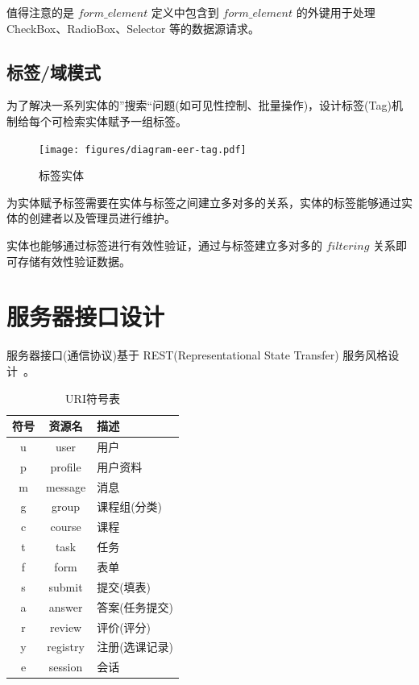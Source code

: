 值得注意的是 $form\_element$ 定义中包含到 $form\_element$ 的外键用于处理 CheckBox、RadioBox、Selector 等的数据源请求。

\subsection{标签/域模式}

为了解决一系列实体的”搜索“问题(如可见性控制、批量操作)，设计标签(Tag)机制给每个可检索实体赋予一组标签。

\begin{figure}[!h]
  \begin{center}
    \texttt{[image: figures/diagram-eer-tag.pdf]}
    \caption{标签实体\label{DatabaseEntityTag}}
  \end{center}
\end{figure}

为实体赋予标签需要在实体与标签之间建立多对多的关系，实体的标签能够通过实体的创建者以及管理员进行维护。

实体也能够通过标签进行有效性验证，通过与标签建立多对多的 $filtering$ 关系即可存储有效性验证数据。

\newpage

\section{服务器接口设计\label{sec:ServerAPI}}

服务器接口(通信协议)基于 REST(Representational State Transfer) 服务风格设计~\cite{fielding2002principled}。

\begin{table}[!h]
  \begin{center}
    \noindent
    \ttfamily
    \begin{tabular}{|c|c|l|}
      \hline
      \textbf{符号} & \textbf{资源名} & \textbf{描述} \\ \hline
      u & user      & 用户          \\ \hline
      p & profile   & 用户资料      \\ \hline
      m & message   & 消息          \\ \hline
      g & group     & 课程组(分类)  \\ \hline
      c & course    & 课程          \\ \hline
      t & task      & 任务          \\ \hline
      f & form      & 表单          \\ \hline
      s & submit    & 提交(填表)    \\ \hline
      a & answer    & 答案(任务提交)\\ \hline
      r & review    & 评价(评分)    \\ \hline
      y & registry  & 注册(选课记录)\\ \hline
      e & session   & 会话          \\ \hline
    \end{tabular}
    \caption{URI符号表\label{APURIGlossary}}
  \end{center}
\end{table}

